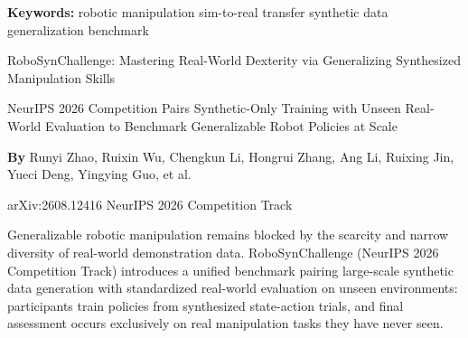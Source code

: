 \documentclass[10pt,twocolumn]{article}
\begin{document}
\setlength{\parindent}{0pt}
\setlength{\parskip}{4pt}

{\small\color{keywordgray}\textbf{Keywords:}
  robotic manipulation \textbullet{}
  sim-to-real transfer \textbullet{}
  synthetic data \textbullet{}
  generalization benchmark}\par\vspace{4pt}

{\LARGE\bfseries\raggedright
  RoboSynChallenge: Mastering Real-World Dexterity
  via Generalizing Synthesized Manipulation Skills}\par\vspace{4pt}

{\large\itshape\raggedright
  NeurIPS 2026 Competition Pairs Synthetic-Only Training with Unseen Real-World Evaluation
  to Benchmark Generalizable Robot Policies at Scale}\par\vspace{6pt}

{\small\textbf{By} Runyi Zhao, Ruixin Wu, Chengkun Li, Hongrui Zhang, Ang Li,
  Ruixing Jin, Yueci Deng, Yingying Guo, et al.}\par\vspace{2pt}

{\small\color{keywordgray}arXiv:2608.12416 \textbullet{}
  NeurIPS 2026 Competition Track}
\par\vspace{2pt}\noindent{\color{rulered}\rule{\columnwidth}{0.6pt}}\vspace{6pt}

Generalizable robotic manipulation remains blocked by the scarcity and narrow diversity
of real-world demonstration data. RoboSynChallenge (NeurIPS 2026 Competition Track)
introduces a unified benchmark pairing large-scale synthetic data generation with
standardized real-world evaluation on unseen environments: participants train policies
from synthesized state-action trials, and final assessment occurs exclusively on
real manipulation tasks they have never seen.
\end{document}
